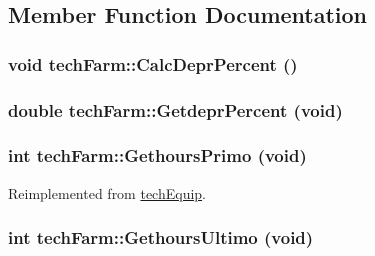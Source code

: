 \subsection{Member Function Documentation}
\hypertarget{classtech_farm_a0a91f0c3a4542469ae9e3c72727636ab}{
\subsubsection[{CalcDeprPercent}]{\setlength{\rightskip}{0pt plus 5cm}void techFarm::CalcDeprPercent ()}}
\label{classtech_farm_a0a91f0c3a4542469ae9e3c72727636ab}
\hypertarget{classtech_farm_a319874aeafaad8782ca855c681dba134}{
\subsubsection[{GetdeprPercent}]{\setlength{\rightskip}{0pt plus 5cm}double techFarm::GetdeprPercent (void)}}
\label{classtech_farm_a319874aeafaad8782ca855c681dba134}
\hypertarget{classtech_farm_ad61694fe36efc7411dbe4de32452a214}{
\subsubsection[{GethoursPrimo}]{\setlength{\rightskip}{0pt plus 5cm}int techFarm::GethoursPrimo (void)}}
\label{classtech_farm_ad61694fe36efc7411dbe4de32452a214}


Reimplemented from \hyperlink{classtech_equip_aa1d824dcc6a0b20bf896a4e9a63542ae}{techEquip}.\hypertarget{classtech_farm_aa35b82884aeaf19920b51eee73587026}{
\subsubsection[{GethoursUltimo}]{\setlength{\rightskip}{0pt plus 5cm}int techFarm::GethoursUltimo (void)}}
\label{classtech_farm_aa35b82884aeaf19920b51eee73587026}


